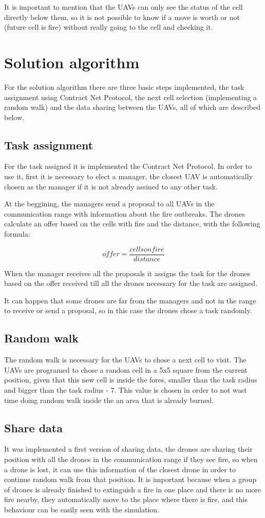 \documentclass{article}
\begin{document}
It is important to mention that the UAVs can only see the status of the cell directly below them, so it is not possible to know if a move is worth or not (future cell is fire) without really going to the cell and checking it.

\section{Solution algorithm}
For the solution algorithm there are three basic steps implemented, the task assignment using Contract Net Protocol, the next cell selection (implementing a random walk) and the data sharing between the UAVs, all of which are described below.

\subsection{Task assignment}
For the task assigned it is implemented the Contract Net Protocol. In order to use it, first it is necessary to elect a manager, the closest UAV is automatically chosen as the manager if it is not already assined to any other task.

At the beggining, the managers send a proposal to all UAVs in the communication range with information about the fire outbreaks. The drones calculate an offer based on the cells with fire and the distance, with the following formula:

\[ offer = \dfrac{cells on fire}{distance} \]

When the manager receives all the proposals it assigns the task for the drones based on the offer received till all the drones necessary for the task are assigned.

It can happen that some drones are far from the managers and not in the range to receive or send a proposal, so in this case the drones chose a task randomly.

\subsection{Random walk}
The random walk is necessary for the UAVs to chose a next cell to visit. The UAVs are programed to chose a random cell in a 5x5 square from the current position, given that this new cell is inside the fores, smaller than the task radius and bigger than the task radius - 7. This value is chosen in order to not wast time doing random walk inside the an area that is already burned.

\subsection{Share data}
It was implemented a first version of sharing data, the drones are sharing their position with all the drones in the communication range if they see fire, so when a drone is lost, it can use this information of the closest drone in order to continue random walk from that position. It is important because when a group of drones is already finished to extinguish a fire in one place and there is no more fire nearby, they automatically move to the place where there is fire, and this behaviour can be easily seen with the simulation.
\end{document}
